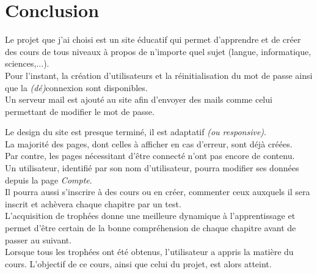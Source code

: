 \section{Conclusion}
\label{sec:conclusion}

Le projet que j'ai choisi est un site éducatif qui permet d'apprendre et de créer des cours de tous niveaux à propos de n'importe quel sujet (langue, informatique, sciences,...). \\

Pour l'instant, la création d'utilisateurs et la réinitialisation du mot de passe ainsi que la \textit{(dé)}connexion sont disponibles. \\
Un serveur mail est ajouté au site afin d'envoyer des mails comme celui permettant de modifier le mot de passe.

Le design du site est presque terminé, il est adaptatif \textit{(ou responsive)}. \\
La majorité des pages, dont celles à afficher en cas d'erreur, sont déjà créées. \\
Par contre, les pages nécessitant d'être connecté n'ont pas encore de contenu. \\

Un utilisateur, identifié par son nom d'utilisateur, pourra modifier ses données depuis la page \textit{Compte}. \\
Il pourra aussi s'inscrire à des cours ou en créer, commenter ceux auxquels il sera inscrit et achèvera chaque chapitre par un test. \\

L'acquisition de trophées donne une meilleure dynamique à l'apprentissage et permet d'être certain de la bonne compréhension de chaque chapitre avant de passer au suivant. \\

Lorsque tous les trophées ont été obtenus, l'utilisateur a appris la matière du cours. L'objectif de ce cours, ainsi que celui du projet, est alors atteint.